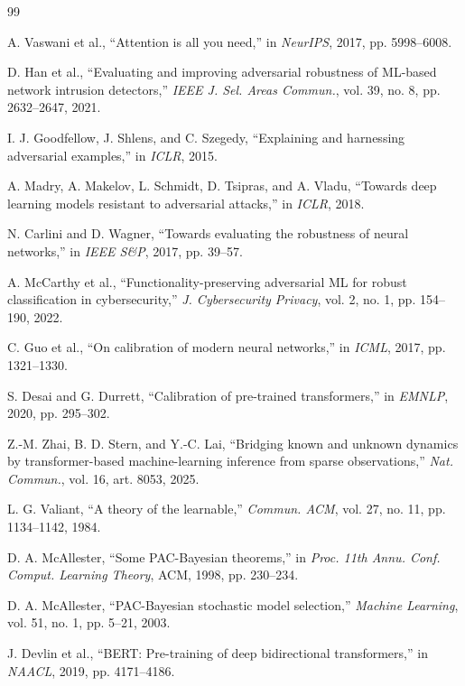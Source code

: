 \documentclass[12pt,a4paper]{article}
\theoremstyle{definition}
\begin{document}
\begin{thebibliography}{99}

A. Vaswani et al., ``Attention is all you need,'' in \emph{NeurIPS}, 2017, pp. 5998--6008.

D. Han et al., ``Evaluating and improving adversarial robustness of ML-based network intrusion detectors,'' \emph{IEEE J. Sel. Areas Commun.}, vol. 39, no. 8, pp. 2632--2647, 2021.

I. J. Goodfellow, J. Shlens, and C. Szegedy, ``Explaining and harnessing adversarial examples,'' in \emph{ICLR}, 2015.

A. Madry, A. Makelov, L. Schmidt, D. Tsipras, and A. Vladu, ``Towards deep learning models resistant to adversarial attacks,'' in \emph{ICLR}, 2018.

N. Carlini and D. Wagner, ``Towards evaluating the robustness of neural networks,'' in \emph{IEEE S\&P}, 2017, pp. 39--57.

A. McCarthy et al., ``Functionality-preserving adversarial ML for robust classification in cybersecurity,'' \emph{J. Cybersecurity Privacy}, vol. 2, no. 1, pp. 154--190, 2022.

C. Guo et al., ``On calibration of modern neural networks,'' in \emph{ICML}, 2017, pp. 1321--1330.

S. Desai and G. Durrett, ``Calibration of pre-trained transformers,'' in \emph{EMNLP}, 2020, pp. 295--302.

Z.-M. Zhai, B. D. Stern, and Y.-C. Lai, ``Bridging known and unknown dynamics by transformer-based machine-learning inference from sparse observations,'' \emph{Nat. Commun.}, vol. 16, art. 8053, 2025.

L. G. Valiant, ``A theory of the learnable,'' \emph{Commun. ACM}, vol. 27, no. 11, pp. 1134--1142, 1984.

D. A. McAllester, ``Some PAC-Bayesian theorems,'' in \emph{Proc. 11th Annu. Conf. Comput. Learning Theory}, ACM, 1998, pp. 230--234.

D. A. McAllester, ``PAC-Bayesian stochastic model selection,'' \emph{Machine Learning}, vol. 51, no. 1, pp. 5--21, 2003.

J. Devlin et al., ``BERT: Pre-training of deep bidirectional transformers,'' in \emph{NAACL}, 2019, pp. 4171--4186.


\end{thebibliography}
\end{document}
